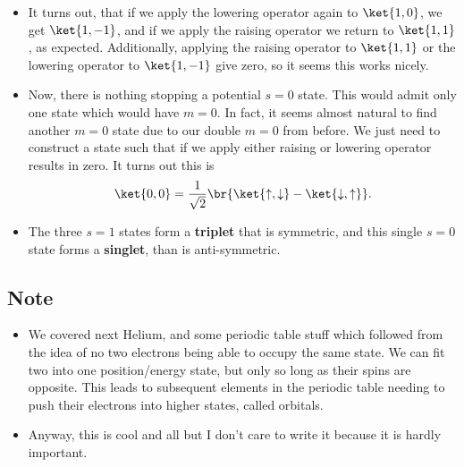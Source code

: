 \begin{itemize}
    \item It turns out, that if we apply the lowering operator again to $\ket{1,0}$, we get $\ket{1,-1}$, and if we apply the raising operator we return to $\ket{1,1}$, as expected. Additionally, applying the raising operator to $\ket{1,1}$ or the lowering operator to $\ket{1,-1}$ give zero, so it seems this works nicely.
    \item Now, there is nothing stopping a potential $s=0$ state. This would admit only one state which would have $m=0$. In fact, it seems almost natural to find another $m=0$ state due to our double $m=0$ from before. We just need to construct a state such that if we apply either raising or lowering operator results in zero. It turns out this is
        \begin{equation}
            \ket{0,0} = \frac{1}{\sqrt{2}}\br{\ket{\uparrow,\downarrow} - \ket{\downarrow,\uparrow}}.
        \end{equation}
    \item The three $s=1$ states form a \textbf{triplet} that is symmetric, and this single $s=0$ state forms a \textbf{singlet}, than is anti-symmetric.
\end{itemize}


\subsection*{Note}
\begin{itemize}
    \item We covered next Helium, and some periodic table stuff which followed from the idea of no two electrons being able to occupy the same state. We can fit two into one position/energy state, but only so long as their spins are opposite. This leads to subsequent elements in the periodic table needing to push their electrons into higher states, called orbitals.
    \item Anyway, this is cool and all but I don't care to write it because it is hardly important.
    \end{itemize}

    
